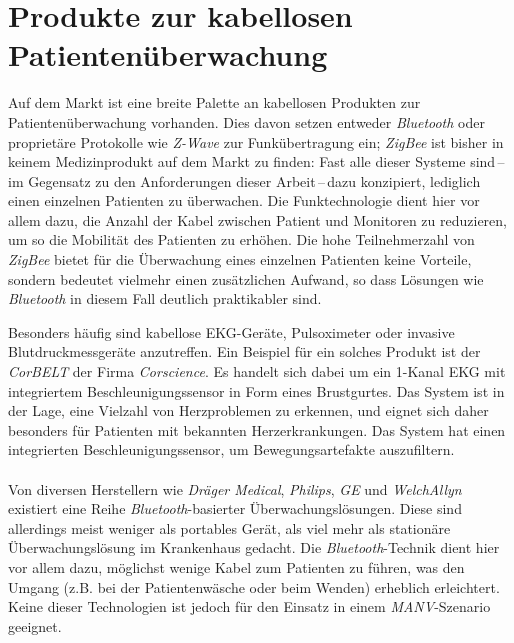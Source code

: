 \section{Produkte zur kabellosen Patientenüberwachung}\label{produkte_zur_patientenueberwachung}

Auf dem Markt ist eine breite Palette an kabellosen Produkten zur Patientenüberwachung vorhanden. Dies  davon setzen
entweder \emph{Bluetooth} oder proprietäre Protokolle wie \emph{Z-Wave} zur Funkübertragung ein; \emph{ZigBee} ist bisher in
keinem Medizinprodukt auf dem Markt zu finden: Fast alle dieser Systeme sind\,--\,im Gegensatz zu den Anforderungen dieser
Arbeit\,--\,dazu konzipiert, lediglich einen einzelnen 
Patienten zu überwachen. Die Funktechnologie dient hier vor allem dazu, die Anzahl der Kabel zwischen Patient und Monitoren 
zu reduzieren, um so die Mobilität des Patienten zu erhöhen. Die hohe Teilnehmerzahl von \emph{ZigBee} bietet für die 
Überwachung eines einzelnen Patienten keine Vorteile, sondern bedeutet vielmehr einen zusätzlichen Aufwand, so dass Lösungen
wie \emph{Bluetooth} in diesem Fall deutlich praktikabler sind.

Besonders häufig sind kabellose EKG-Geräte, Pulsoximeter oder 
invasive Blutdruckmessgeräte anzutreffen.              
Ein Beispiel für ein solches Produkt ist der \emph{CorBELT} der Firma \emph{Corscience}. Es handelt sich dabei
um ein 1-Kanal EKG mit integriertem Beschleunigungssensor in Form eines Brustgurtes. Das System ist in der
Lage, eine Vielzahl von Herzproblemen zu erkennen, und 
eignet sich daher besonders für Patienten mit bekannten
Herzerkrankungen. Das System hat einen integrierten Beschleunigungssensor, um Bewegungsartefakte auszufiltern.\cite{Corscience}
\\
\\
Von diversen Herstellern wie \emph{Dräger Medical}, \emph{Philips}, \emph{GE} und \emph{WelchAllyn} existiert eine 
Reihe \emph{Bluetooth}-basierter Überwachungslösungen. Diese sind allerdings meist weniger als portables Gerät, als viel 
mehr als stationäre Überwachungslösung im Krankenhaus gedacht. Die \emph{Bluetooth}-Technik dient hier vor allem dazu, 
möglichst wenige Kabel zum Patienten zu führen, was den Umgang (z.B. bei der Patientenwäsche oder beim Wenden)
erheblich erleichtert. Keine dieser Technologien ist jedoch für den Einsatz in einem \emph{MANV}-Szenario
geeignet.
       

